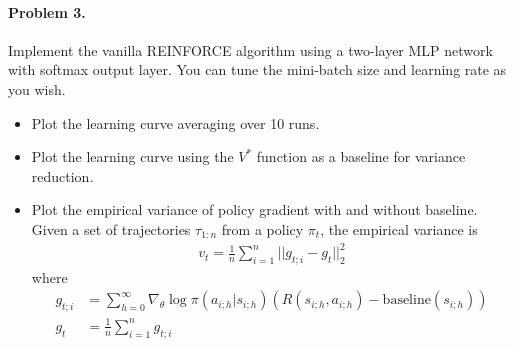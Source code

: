 \documentclass{article}
\begin{document}
\paragraph{Problem 3.} Implement the vanilla REINFORCE algorithm using a two-layer MLP network with softmax output layer. You can tune the mini-batch size and learning rate as you wish.
\begin{itemize}
    \item Plot the learning curve averaging over 10 runs.
    \item Plot the learning curve using the $V^*$ function as a baseline for variance reduction.
    \item Plot the empirical variance of policy gradient with and without baseline. Given a set of trajectories $\tau_{1:n}$ from a policy $\pi_t$, the empirical variance is 
    \begin{align*}
        v_t= \frac{1}{n} \sum_{i=1}^n ||g_{t;i}-g_t||_2^2
    \end{align*}
    where 
    \begin{align*}
    g_{t;i}&=\sum_{h=0}^\infty \nabla_\theta\log\pi(a_{i;h}|s_{i;h}) (R(s_{i;h},a_{i;h})- \text{baseline}(s_{i;h}))\\
    g_t &= \frac{1}{n} \sum_{i=1}^n g_{t;i}
    \end{align*}
\end{itemize}
\end{document}

